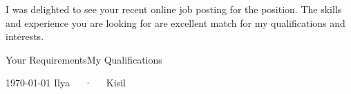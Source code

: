 \documentclass[11pt, a4paper]{ilyakisil-cv}
\begin{document}
\makecvheader[R]

\makelettertitle

\begin{cvletter}

    \lorem \lorem \lorem


    \lorem

    I was delighted to see your recent online job posting for the \fillme position. The skills and experience you are looking for are excellent match for my qualifications and interests.

    \begin{lettermatchitems}{Your Requirements}{My Qualifications}
            {%
                \lorem
            }
            {%
                \lorem
            }
    \end{lettermatchitems}

\end{cvletter}

\makeletterclosing

\makecvfooter
  {\today}
  {Ilya~~~·~~~Kisil}
  {\thepage}
\end{document}
